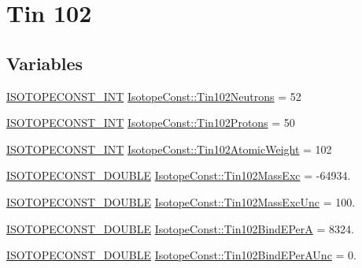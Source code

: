 \hypertarget{group___isotope_const-_tin-_sn102}{}\section{Tin 102}
\label{group___isotope_const-_tin-_sn102}
\subsection*{Variables}
\begin{DoxyCompactItemize}
\item 
\mbox{\hyperlink{group___isotope_const-_macros_ga5f18360b3e99483a35c32d789e62621c}{I\+S\+O\+T\+O\+P\+E\+C\+O\+N\+S\+T\+\_\+\+I\+NT}} \mbox{\hyperlink{group___isotope_const-_tin-_sn102_ga17743d2d6cc5d22e856a84c072b148c5}{Isotope\+Const\+::\+Tin102\+Neutrons}} = 52
\item 
\mbox{\hyperlink{group___isotope_const-_macros_ga5f18360b3e99483a35c32d789e62621c}{I\+S\+O\+T\+O\+P\+E\+C\+O\+N\+S\+T\+\_\+\+I\+NT}} \mbox{\hyperlink{group___isotope_const-_tin-_sn102_gaec9ac76965c958c61eb760e944653a3f}{Isotope\+Const\+::\+Tin102\+Protons}} = 50
\item 
\mbox{\hyperlink{group___isotope_const-_macros_ga5f18360b3e99483a35c32d789e62621c}{I\+S\+O\+T\+O\+P\+E\+C\+O\+N\+S\+T\+\_\+\+I\+NT}} \mbox{\hyperlink{group___isotope_const-_tin-_sn102_ga4f99e99c763b225b3195700fd1d472d1}{Isotope\+Const\+::\+Tin102\+Atomic\+Weight}} = 102
\item 
\mbox{\hyperlink{group___isotope_const-_macros_ga8f45a7272ce02c0b4c65c44636ed719a}{I\+S\+O\+T\+O\+P\+E\+C\+O\+N\+S\+T\+\_\+\+D\+O\+U\+B\+LE}} \mbox{\hyperlink{group___isotope_const-_tin-_sn102_gabebd415dc7261bf5248c23cf47cc1034}{Isotope\+Const\+::\+Tin102\+Mass\+Exc}} = -\/64934.
\item 
\mbox{\hyperlink{group___isotope_const-_macros_ga8f45a7272ce02c0b4c65c44636ed719a}{I\+S\+O\+T\+O\+P\+E\+C\+O\+N\+S\+T\+\_\+\+D\+O\+U\+B\+LE}} \mbox{\hyperlink{group___isotope_const-_tin-_sn102_ga4688c224e4351e6cef0f6b2652240ef0}{Isotope\+Const\+::\+Tin102\+Mass\+Exc\+Unc}} = 100.
\item 
\mbox{\hyperlink{group___isotope_const-_macros_ga8f45a7272ce02c0b4c65c44636ed719a}{I\+S\+O\+T\+O\+P\+E\+C\+O\+N\+S\+T\+\_\+\+D\+O\+U\+B\+LE}} \mbox{\hyperlink{group___isotope_const-_tin-_sn102_ga929870a7fc11ec154d561ef0fa28482c}{Isotope\+Const\+::\+Tin102\+Bind\+E\+PerA}} = 8324.
\item 
\mbox{\hyperlink{group___isotope_const-_macros_ga8f45a7272ce02c0b4c65c44636ed719a}{I\+S\+O\+T\+O\+P\+E\+C\+O\+N\+S\+T\+\_\+\+D\+O\+U\+B\+LE}} \mbox{\hyperlink{group___isotope_const-_tin-_sn102_ga6b2903544699183f0d2c0bdc07c6e97f}{Isotope\+Const\+::\+Tin102\+Bind\+E\+Per\+A\+Unc}} = 0.

\end{DoxyCompactItemize}
